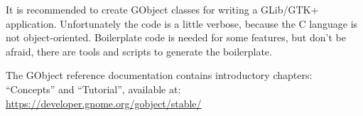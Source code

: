 It is recommended to create GObject classes for writing a GLib/GTK+ application. Unfortunately the code is a little verbose, because the C language is not object-oriented. Boilerplate code is needed for some features, but don't be afraid, there are tools and scripts to generate the boilerplate.

The GObject reference documentation contains introductory chapters: ``Concepts'' and ``Tutorial'', available at:\\
\url{https://developer.gnome.org/gobject/stable/}

